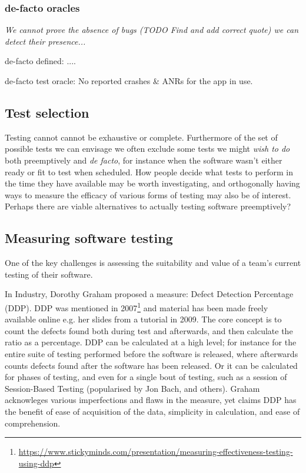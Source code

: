 \subsubsection{de-facto oracles}
\textit{We cannot prove the absence of bugs (TODO Find and add correct quote) we can detect their presence...}

de-facto defined: ....

de-facto test oracle: No reported crashes \& ANRs for the app in use. 


\subsection{Test selection}
Testing cannot cannot be exhaustive or complete. Furthermore of the set of possible tests we can envisage we often exclude some tests we might \textit{wish to do} both preemptively and \textit{de facto}, for instance when the software wasn't either ready or fit to test when scheduled. How people decide what tests to perform in the time they have available may be worth investigating, and orthogonally having ways to measure the efficacy of various forms of testing may also be of interest. Perhaps there are viable alternatives to actually testing software preemptively?  

\subsection{Measuring software testing}
One of the key challenges is assessing the suitability and value of a team's current testing of their software. 

In Industry, Dorothy Graham proposed a measure: Defect Detection Percentage (DDP). DDP was mentioned in 2007\footnote{\url{https://www.stickyminds.com/presentation/measuring-effectiveness-testing-using-ddp}} and material has been made freely available online e.g. her slides from a tutorial in 2009\cite{graham_measuring_2009}. The core concept is to count the defects found both during test and afterwards, and then calculate the ratio as a percentage. DDP can be calculated at a high level; for instance for the entire suite of testing performed before the software is released, where afterwards counts defects found after the software has been released. Or it can be calculated for phases of testing, and even for a single bout of testing, such as a session of Session-Based Testing (popularised by Jon Bach, and others). Graham acknowleges various imperfections and flaws in the measure, yet claims DDP has the benefit of ease of acquisition of the data, simplicity in calculation, and ease of comprehension. 

